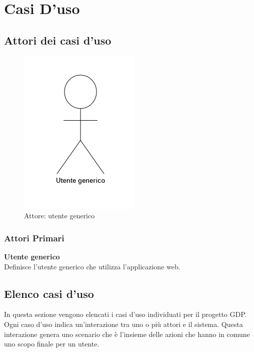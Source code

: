 \chapter{Casi D'uso}\label{casiDuso}
\section{Attori dei casi d'uso}
\begin{center}
	\begin{figure}[H]
		\includegraphics{../immagini/attori_casi/attore.png}
		\caption{Attore: utente generico}
	\end{figure}
\end{center}
\subsection{Attori Primari}\label{attoriPrimari}
\textbf{Utente generico}\\
\hspace{10mm} Definisce l'utente generico che utilizza l'applicazione web.


\section{Elenco casi d'uso}\label{elencoCasiDuso}
In questa sezione vengono elencati i casi d'uso individuati per il progetto GDP. Ogni caso d'uso indica un'interazione tra uno o più attori e il sistema. Questa interazione genera uno scenario che è l'insieme delle azioni che hanno in comune uno scopo finale per un utente.

